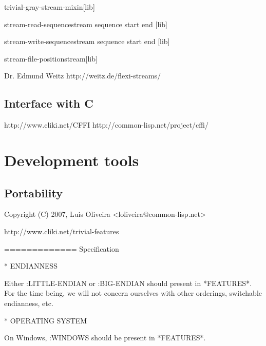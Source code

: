 \documentclass[10pt,english]{book}
\begin{document}
\begin{class}{trivial-gray-stream-mixin}{}[lib]
          
\end{class}

\begin{function}{stream-read-sequence}{stream sequence start end \key}[lib]
  
\end{function}

\begin{function}{stream-write-sequence}{stream sequence start end \key}[lib]
  
\end{function}

\begin{function}{stream-file-position}{stream}[lib]
  
\end{function}

Dr. Edmund Weitz
http://weitz.de/flexi-streams/

\section{Interface with C}
\label{sec:interface-with-c}

http://www.cliki.net/CFFI
http://common-lisp.net/project/cffi/



\chapter{Development tools}
\label{cha:development-tools}

\section{Portability}
\label{sec:portability}

Copyright (C) 2007, Luis Oliveira  <loliveira@common-lisp.net>

http://www.cliki.net/trivial-features

=============
Specification

* ENDIANNESS

Either :LITTLE-ENDIAN or :BIG-ENDIAN should present in *FEATURES*.
For the time being, we will not concern ourselves with other
orderings, switchable endianness, etc.


* OPERATING SYSTEM

On Windows, :WINDOWS should be present in *FEATURES*.
\end{document}
